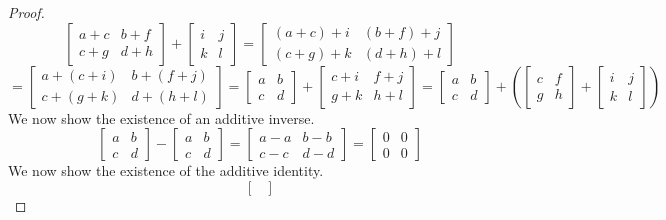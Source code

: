 \begin{proof}
\[\begin{bmatrix}
        a+c & b+f \\
        c+g & d+h
    \end{bmatrix} +\begin{bmatrix}
        i & j \\
        k & l
    \end{bmatrix} = \begin{bmatrix}
        (a+c)+i & (b+f)+j \\
        (c+g)+k & (d+h)+l
    \end{bmatrix}\] \[= \begin{bmatrix}
        a+(c+i) & b+(f+j) \\
        c+(g+k) & d+(h+l)
    \end{bmatrix} = \begin{bmatrix}
        a & b \\
        c & d
    \end{bmatrix} + \begin{bmatrix}
        c+i & f+j \\
        g+k & h+l
    \end{bmatrix} = \begin{bmatrix}
        a & b \\
        c & d
    \end{bmatrix} + \left(\begin{bmatrix}
        c & f \\
        g & h
    \end{bmatrix} + \begin{bmatrix}
        i & j \\
        k & l
    \end{bmatrix}\right)\]
    We now show the existence of an additive inverse.
    \[\begin{bmatrix}
        a & b \\
        c & d
    \end{bmatrix} -\begin{bmatrix}
        a & b \\
        c & d
    \end{bmatrix} = \begin{bmatrix}
        a-a & b-b \\
        c-c & d-d
    \end{bmatrix} = \begin{bmatrix}
        0 & 0 \\
        0 & 0
    \end{bmatrix}\]
    We now show the existence of the additive identity.
    \[\begin{bmatrix}

\end{bmatrix}\]
\end{proof}

